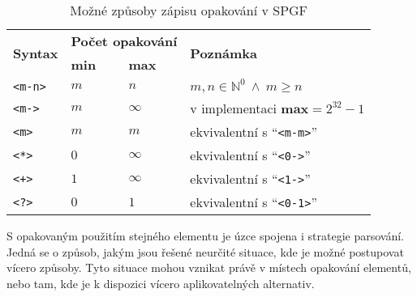 \begin{table}[ht!]
	\centering
	\def\width{14mm}
	\begin{tabular}{|l|p{\width}|p{\width}|l|}
		\hline
		\multirow{2}{*}{\textbf{Syntax}} & \multicolumn{2}{c|}{\textbf{Počet opakování}} & \multirow{2}{*}{\textbf{Poznámka}}                                               \\
		\cline{2-3}
		                                 & \textbf{min}                                  & \textbf{max}                       &                                             \\
		\hline
		\texttt{<m-n>}                   & $m$                                           & $n$                                & $m,n \in \mathbb{N}^{0} \ \wedge \ m\geq n$ \\
		\hline
		\texttt{<m->}                    & $m$                                           & $\infty$                           & v implementaci $\textbf{max} = 2^{32}-1$    \\
		\hline
		\texttt{<m>}                     & $m$                                           & $m$                                & ekvivalentní s \enquote{\texttt{<m-m>}}     \\
		\hline
		\texttt{<*>}                     & $0$                                           & $\infty$                           & ekvivalentní s \enquote{\texttt{<0->}}      \\
		\hline
		\texttt{<+>}                     & $1$                                           & $\infty$                           & ekvivalentní s \enquote{\texttt{<1->}}      \\
		\hline
		\texttt{<?>}                     & $0$                                           & $1$                                & ekvivalentní s \enquote{\texttt{<0-1>}}     \\
		\hline
	\end{tabular}
	\caption{Možné způsoby zápisu opakování v SPGF}\label{tab:repeat_syntax}
\end{table}

S opakovaným použitím stejného elementu je úzce spojena i strategie parsování.
Jedná se o způsob, jakým jsou řešené neurčité situace, kde je možné postupovat vícero způsoby.
Tyto situace mohou vznikat právě v místech opakování elementů, nebo tam, kde je k dispozici vícero aplikovatelných alternativ.


